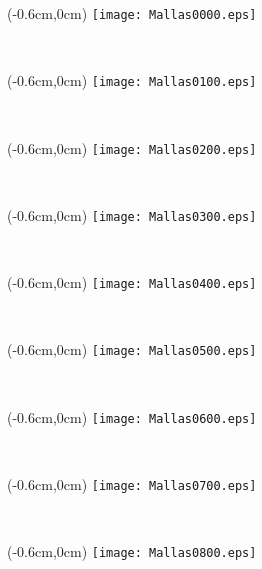 \documentclass[12pt,letterpaper,oneside]{report}
\begin{document}
\begin{textblock*}{\paperwidth}(-0.6cm,0cm)
\texttt{[image: Mallas0000.eps]}
\end{textblock*}

\ \pagebreak

\begin{textblock*}{\paperwidth}(-0.6cm,0cm)
\texttt{[image: Mallas0100.eps]}
\end{textblock*}

\ \pagebreak

\begin{textblock*}{\paperwidth}(-0.6cm,0cm)
\texttt{[image: Mallas0200.eps]}
\end{textblock*}

\ \pagebreak

\begin{textblock*}{\paperwidth}(-0.6cm,0cm)
\texttt{[image: Mallas0300.eps]}
\end{textblock*}

\ \pagebreak

\begin{textblock*}{\paperwidth}(-0.6cm,0cm)
\texttt{[image: Mallas0400.eps]}
\end{textblock*}

\ \pagebreak

\begin{textblock*}{\paperwidth}(-0.6cm,0cm)
\texttt{[image: Mallas0500.eps]}
\end{textblock*}

\ \pagebreak

\begin{textblock*}{\paperwidth}(-0.6cm,0cm)
\texttt{[image: Mallas0600.eps]}
\end{textblock*}

\ \pagebreak

\begin{textblock*}{\paperwidth}(-0.6cm,0cm)
\texttt{[image: Mallas0700.eps]}
\end{textblock*}

\ \pagebreak

\begin{textblock*}{\paperwidth}(-0.6cm,0cm)
\texttt{[image: Mallas0800.eps]}
\end{textblock*}
\end{document}
